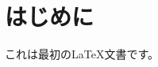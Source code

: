\documentclass[uplatex,a4paper]{jsarticle}
\begin{document}
\section{はじめに}
これは最初のLaTeX文書です。
\end{document}
